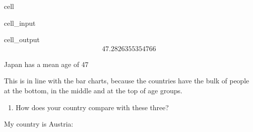 \documentclass[letterpaper,10pt,english]{jupyterBook}
\begin{document}
\begin{sphinxuseclass}{cell}\begin{sphinxVerbatimInput}

\begin{sphinxuseclass}{cell_input}
\begin{sphinxVerbatim}[commandchars=\\\{\}]
\end{sphinxVerbatim}

\end{sphinxuseclass}\end{sphinxVerbatimInput}
\begin{sphinxVerbatimOutput}

\begin{sphinxuseclass}{cell_output}\begin{equation*}
\begin{split}47.2826355354766\end{split}
\end{equation*}
\end{sphinxuseclass}\end{sphinxVerbatimOutput}

\end{sphinxuseclass}
\sphinxAtStartPar
Japan has a mean age of 47

\sphinxAtStartPar
This is in line with the bar charts, because the countries have the bulk of people at the bottom, in the middle and at the top of age groups.
\begin{enumerate}
%
\setcounter{enumi}{3}
\item {} 
\sphinxAtStartPar
How does your country compare with these three?

\end{enumerate}

\sphinxAtStartPar
My country is Austria:
\end{document}
